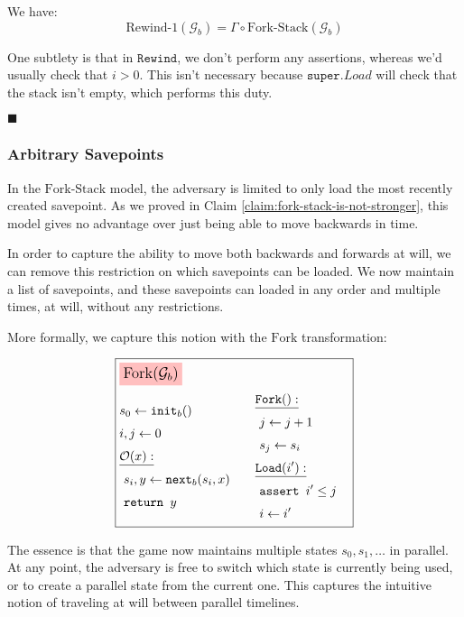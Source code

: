 We have:
$$
\text{Rewind-1}(\mathcal{G}_b) = \Gamma \circ \text{Fork-Stack}(\mathcal{G}_b)
$$

One subtlety is that in $\texttt{Rewind}$, we don't perform any assertions,
whereas we'd usually check that $i > 0$.
This isn't necessary because $\texttt{super}.Load$ will check that the stack
isn't empty, which performs this duty.

$\blacksquare$

\subsubsection{Arbitrary Savepoints}

In the $\text{Fork-Stack}$ model, the adversary is limited to only
load the most recently created savepoint.
As we proved in Claim \ref{claim:fork-stack-is-not-stronger}, this model
gives no advantage over just being able to move backwards in time.

In order to capture the ability to move both backwards and forwards
at will, we can remove this restriction on which savepoints can be loaded.
We now maintain a list of savepoints, and these savepoints can loaded
in any order and multiple times, at will, without any restrictions.

More formally, we capture this notion with the
$\text{Fork}$ transformation:

\begin{game}
\captionsetup{justification=centering}
$$
\boxed{
\begin{aligned}
&\colorbox{pink}{\large $\text{Fork}(\mathcal{G}_b)$}\cr
&\begin{aligned}
    &s_0 \gets \texttt{init}_b()\cr
    &i, j \gets 0\cr
    &\underline{\mathcal{O}(x):}\cr
    &\ s_i, y \gets \texttt{next}_b(s_i, x)\cr
    &\ \texttt{return } y\cr
\end{aligned}
&\begin{aligned}
    &\underline{\texttt{Fork}():}\cr
    &\ j \gets j + 1\cr
    &\ s_j \gets s_i\cr
    &\underline{\texttt{Load}(i'):}\cr
    &\ \texttt{assert } i' \leq j\cr
    &\ i \gets i'\cr
\end{aligned}\cr
\end{aligned}
}
$$
\caption{$\text{Fork}(\mathcal{G}_b)$}
\end{game}

The essence is that the game now maintains multiple states $s_0, s_1, \ldots$
in parallel.
At any point, the adversary is free to switch which state is currently
being used, or to create a parallel state from the current one.
This captures the intuitive notion of traveling at will between
parallel timelines.


